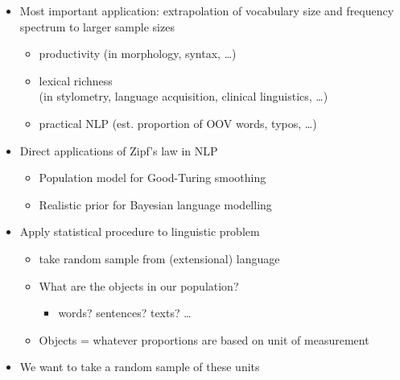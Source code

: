 \documentclass[a4paper,landscape,headrule,footrule,xetex]{foils}
\begin{document}
\begin{itemize}
  \item Most important application: extrapolation of vocabulary
size and frequency spectrum to larger sample sizes
\begin{itemize}
  \item productivity (in morphology, syntax, \ldots)
  \item lexical richness
\\ (in stylometry, language acquisition, clinical linguistics, \ldots)
\item practical NLP (est. proportion of OOV words, typos, \ldots)
\end{itemize}
\item Direct applications of Zipf’s law in NLP
\begin{itemize}
  \item Population model for Good-Turing smoothing
  \item Realistic prior for Bayesian language modelling
  \end{itemize}
\end{itemize}


\begin{itemize}
\item Apply statistical procedure to linguistic problem
  \begin{itemize}
  \item take random sample from (extensional) language
  \item What are the objects in our population?
    \begin{itemize}
    \item words? sentences? texts? …
    \end{itemize}
  \item Objects = whatever proportions are based on
    \into unit of measurement
  \end{itemize}
\item We want to take a random sample of these units
\end{itemize}

 
\end{document}
